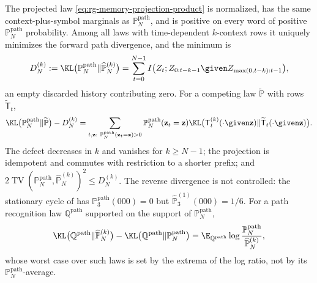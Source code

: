 The projected law \eqref{eq:rg-memory-projection-product} is normalized, has the same
context-plus-symbol marginals as $\mathbb P^{\mathrm{path}}_N$, and is positive on
every word of positive $\mathbb P^{\mathrm{path}}_N$ probability. Among all laws with
time-dependent $k$-context rows it uniquely minimizes the forward path divergence, and
the minimum is
\begin{equation}
D^{(k)}_N:=\KL\bigl(\mathbb P^{\mathrm{path}}_N\Vert\widehat{\mathbb P}^{(k)}_N\bigr)
=\sum_{t=0}^{N-1}I\bigl(Z_t;Z_{0:t-k-1}\given Z_{\max(0,t-k):t-1}\bigr),
\label{eq:rg-memory-information-defect}
\end{equation}
an empty discarded history contributing zero. For a competing law
$\widetilde{\mathbb P}$ with rows $\widetilde{\mathsf T}_t$,
\begin{equation}
\KL\bigl(\mathbb P^{\mathrm{path}}_N\Vert\widetilde{\mathbb P}\bigr)-D^{(k)}_N
=\sum_{t,\mathbf z:\ \mathbb P^{\mathrm{path}}_N(\mathbf z_t=\mathbf z)>0}
\mathbb P^{\mathrm{path}}_N(\mathbf z_t=\mathbf z)
\KL\bigl(\mathsf T^{(k)}_t(\cdot\given\mathbf z)\Vert\widetilde{\mathsf T}_t(\cdot\given\mathbf z)\bigr).
\label{eq:rg-memory-excess-risk}
\end{equation}
The defect decreases in $k$ and vanishes for $k\ge N-1$; the projection is
idempotent and commutes with restriction to a shorter prefix; and
$2\operatorname{TV}(\mathbb P^{\mathrm{path}}_N,\widehat{\mathbb P}^{(k)}_N)^2\le D^{(k)}_N$.
The reverse divergence is not controlled: the stationary cycle of
 has $\mathbb P^{\mathrm{path}}_3(000)=0$ but
$\widehat{\mathbb P}^{(1)}_3(000)=1/6$. For a path recognition law $\mathbb
Q^{\mathrm{path}}$ supported on the support of $\mathbb P^{\mathrm{path}}_N$,
\begin{equation}
\KL\bigl(\mathbb Q^{\mathrm{path}}\Vert\widehat{\mathbb P}^{(k)}_N\bigr)
-\KL\bigl(\mathbb Q^{\mathrm{path}}\Vert\mathbb P^{\mathrm{path}}_N\bigr)
=\E_{\mathbb Q^{\mathrm{path}}}\log\frac{\mathbb P^{\mathrm{path}}_N}{\widehat{\mathbb P}^{(k)}_N},
\label{eq:rg-memory-recognition-vfe-difference}
\end{equation}
whose worst case over such laws is set by the extrema of the log ratio, not by its
$\mathbb P^{\mathrm{path}}_N$-average. 

